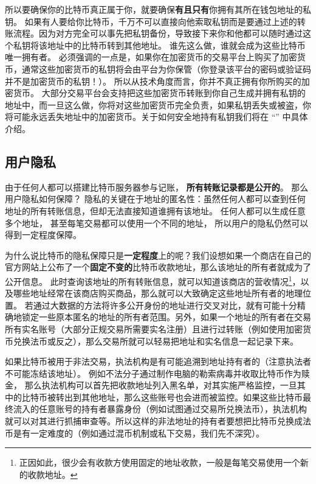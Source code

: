 所以要确保你的比特币真正属于你，就要确保\textbf{有且只有}你拥有其所在钱包地址的私钥。 如果有人要给你比特币，千万不可以直接向他索取私钥而是要通过上述的转账流程。因为对方完全可以事先把私钥备份，导致接下来你和他都可以随时通过这个私钥将该地址中的比特币转到其他地址。 谁先这么做，谁就会成为这些比特币唯一拥有者。 必须强调的一点是，如果你在加密货币的交易平台上购买了加密货币，通常这些加密货币的私钥将会由平台为你保管（你登录该平台的密码或验证码并不是加密货币的私钥！）。 所以从技术角度而言，你并不真正拥有你所购买的加密货币。 大部分交易平台会支持把这些加密货币转账到你自己生成并拥有私钥的地址中，而一旦这么做，你将对这些加密货币完全负责，如果私钥丢失或被盗，你将可能永远丢失地址中的加密货币。关于如何安全地持有私钥我们将在 “” 中具体介绍。


\subsection{用户隐私}
由于任何人都可以搭建比特币服务器参与记账， \textbf{所有转账记录都是公开的}。 那么用户隐私如何保障？ 隐私的关键在于地址的匿名性：虽然任何人都可以查到任何地址的所有转账信息，但却无法直接知道谁拥有该地址。 任何人都可以生成任意多个地址， 甚至每笔交易都可以使用一个不同的地址， 所以用户的隐私仍然可以得到一定程度保障。

为什么说比特币的隐私保障只是\textbf{一定程度}上的呢？我们设想如果一个商店在自己的官方网站上公布了一个\textbf{固定不变的}比特币收款地址，那么该地址的所有者就成为了公开信息。 此时查询该地址的所有转账信息，就可以知道该商店的营收情况\footnote{正因如此，很少会有收款方使用固定的地址收款，一般是每笔交易使用一个新的收款地址。}，以及哪些地址经常在该商店购买商品，那么就可以大致确定这些地址所有者的地理位置。 若通过大数据的方法将许多公开身份的地址进行交叉对比，就有可能十分精确地锁定一些原本匿名的地址的所有者范围。另外，如果一个地址的所有者在交易所有实名账号（大部分正规交易所需要实名注册）且进行过转账（例如使用加密货币兑换法币或反之），那么交易所就可以轻易把地址和实名信息一起记录下来。

如果比特币被用于非法交易，执法机构是有可能追溯到地址持有者的（注意执法者不可能冻结该地址）。 例如不法分子通过制作电脑的勒索病毒并收取比特币作为赎金， 那么执法机构可以首先把收款地址列入黑名单，对其实施严格监控，一旦其中的比特币被转出到其他地址，那么这些账号也会进而被监控。如果这些比特币最终流入的任意账号的持有者暴露身份（例如试图通过交易所兑换法币），执法机构就可以对其进行抓捕审查等。所以这样的非法地址的持有者要想把比特币兑换成法币是有一定难度的（例如通过混币机制或私下交易，我们先不深究）。

